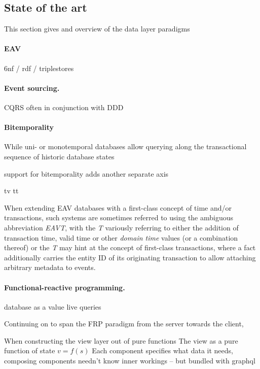 \cleardoublepage
\subsection{State of the art}\label{sec:sota}

This section gives and overview of the data layer paradigms

\paragraph{\gls{EAV}}
6nf / rdf / triplestores


\paragraph{Event sourcing.}
\gls{CQRS}
often in conjunction with \gls{DDD} \cite{evans2004domain}


\paragraph{Bitemporality}
While uni- or monotemporal databases allow querying along the transactional sequence of historic database states

support for bitemporality adds another separate axis

\gls{tv} \gls{tt}

When extending EAV databases with a first-class concept of time and/or transactions, such systems are sometimes referred to using the ambiguous abbreviation \emph{EAVT}, with the \emph{T} variously referring to either the addition of transaction time, valid time or other \emph{domain time} values (or a combination thereof) \cite{huser2013desiderata} or the \emph{T} may hint at the concept of first-class transactions, where a fact additionally carries the entity ID of its originating transaction to allow attaching arbitrary metadata to events.

\paragraph{Functional-reactive programming.}

database as a value \cite{hickey2012dbvalue}
live queries

Continuing on to span the \gls{FRP} paradigm from the server towards the client,
\cite{reynders2014multi}

When constructing the view layer out of pure functions The view as a pure function of state $v=f(s)$
Each component specifies what data it needs, composing components needn't know inner workings -- but bundled with graphql
